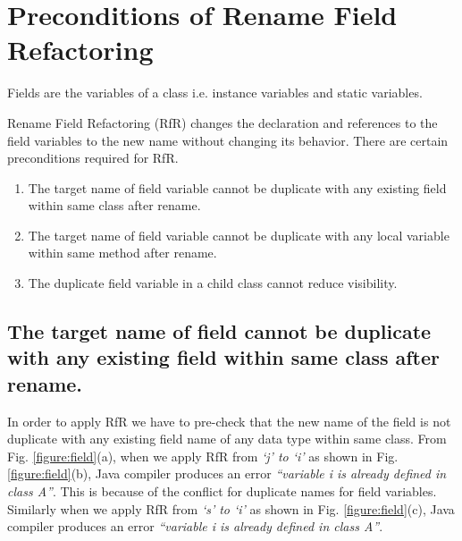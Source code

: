 \section{\textbf{Preconditions of Rename Field Refactoring}}
Fields are the variables of a class i.e. instance variables and static variables.

Rename Field Refactoring (RfR) changes the declaration and references to the field variables to the new name without changing its behavior.
There are certain preconditions required for RfR.

\begin{enumerate}
	\item The target name of field variable cannot be duplicate with any existing field within same class after rename.
	\item The target name of field variable cannot be duplicate with any local variable within same method after rename.
	\item The duplicate field variable in a child class cannot reduce visibility. 
\end{enumerate}

\subsection{The target name of field cannot be duplicate with any existing field within same class after rename.}

In order to apply RfR we have to pre-check that the new name of the field is not duplicate with any existing field name of any data type within same class. From Fig. \ref{figure:field}(a), when we apply RfR from \emph{`j' to `i'} as shown in Fig. \ref{figure:field}(b), Java compiler produces an error \textit{``variable i is already defined in class A''}. This is because of the conflict for duplicate names for field variables. Similarly when we apply RfR from \emph{`s' to `i'} as shown in Fig. \ref{figure:field}(c), Java compiler produces an error \textit{``variable i is already defined in class A''}. 

